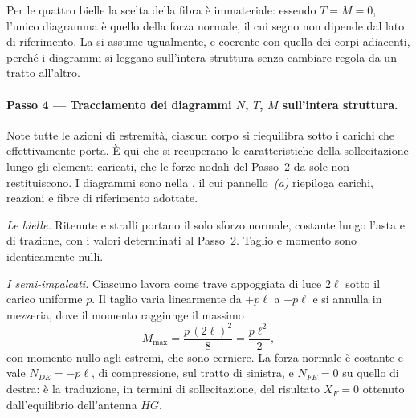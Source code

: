 \begin{oss}
	Per le quattro bielle la scelta della fibra è
	immateriale: essendo $T = M = 0$, l'unico diagramma è
	quello della forza normale, il cui segno non dipende dal
	lato di riferimento. La si assume ugualmente, e coerente
	con quella dei corpi adiacenti, perché i diagrammi si
	leggano sull'intera struttura senza cambiare regola da un
	tratto all'altro.
\end{oss}

\paragraph{Passo 4 --- Tracciamento dei diagrammi $N$, $T$,	$M$ sull'intera struttura.}


Note tutte le azioni di estremità, ciascun corpo si riequilibra sotto i
carichi che effettivamente porta. È qui che si recuperano le
caratteristiche della sollecitazione lungo gli elementi caricati, che le
forze nodali del Passo~2 da sole non restituiscono. I diagrammi sono
nella , il cui pannello~\emph{(a)} riepiloga
carichi, reazioni e fibre di riferimento adottate.







\medskip
\noindent\emph{Le bielle.}
Ritenute e stralli portano il solo sforzo normale, costante
lungo l'asta e di trazione, con i valori determinati al
Passo~2. Taglio e momento sono identicamente nulli.

\medskip
\noindent\emph{I semi-impalcati.}
Ciascuno lavora come trave appoggiata di luce $2\ell$ sotto
il carico uniforme $p$. Il taglio varia linearmente da
$+p\ell$ a $-p\ell$ e si annulla in mezzeria, dove il momento
raggiunge il massimo
\[
M_{\max} = \frac{p\,(2\ell)^2}{8} = \frac{p\ell^2}{2},
\]
con momento nullo agli estremi, che sono cerniere. La forza
normale è costante e vale $N_{DE} = -p\ell$, di compressione,
sul tratto di sinistra, e $N_{FE} = 0$ su quello di destra:
è la traduzione, in termini di sollecitazione, del risultato
$X_F = 0$ ottenuto dall'equilibrio dell'antenna $HG$.

